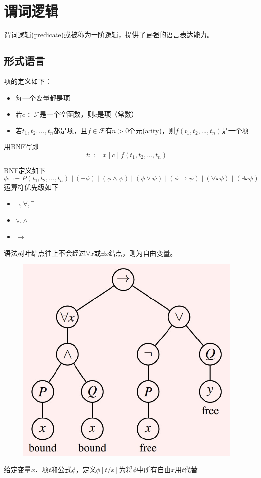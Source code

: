 
\section{谓词逻辑}
谓词逻辑(predicate)或被称为一阶逻辑，提供了更强的语言表达能力。

\subsection{形式语言}
\begin{definition}[项(item)]
项的定义如下：
\begin{itemize}
	\item 每一个变量都是项
	\item 若$c\in\mathcal{F}$是一个空函数，则$c$是项（常数）
	\item 若$t_1,t_2,\ldots,t_n$都是项，且$f\in\mathcal{F}$有$n>0$个元(arity)，则$f(t_1,t_2,\ldots,t_n)$是一个项
\end{itemize}
用BNF写即
\[t::=x\mid c\mid f(t_1,t_2,\ldots,t_n)\]
\end{definition}
\begin{definition}[公式(formula)]
BNF定义如下
\[\phi::=P(t_1,t_2,\ldots,t_n)\mid
(\lnot\phi)\mid
(\phi\land\psi)\mid
(\phi\lor\psi)\mid
(\phi\to\psi)\mid
(\forall x\phi)\mid
(\exists x\phi)\]
运算符优先级如下
\begin{itemize}
	\item $\lnot,\forall,\exists$
	\item $\lor,\land$
	\item $\to$
\end{itemize}
\end{definition}
\begin{definition}
语法树叶结点往上不会经过$\forall x$或$\exists x$结点，则为自由变量。
\begin{figure}[H]
\centering
\includegraphics[width=0.4\linewidth]{fig/free_bound_var.jpg}
\end{figure}
\end{definition}
\begin{definition}[替代(substituion)]
给定变量$x$、项$t$和公式$\phi$，定义$\phi[t/x]$为将$\phi$中所有自由$x$用$t$代替
\end{definition}

